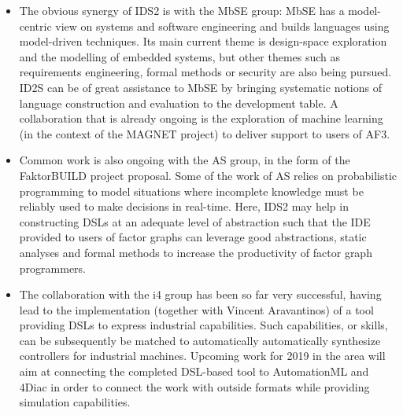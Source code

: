\documentclass{article}
\begin{document}
\begin{itemize}
\item The obvious synergy of IDS2 is with the MbSE group: MbSE has a
model-centric view on systems and software engineering and builds languages using model-driven
techniques. Its main current theme is design-space exploration and the modelling
of  embedded systems, but other themes such as requirements engineering, formal
methods or security are also being pursued. ID2S can be of great assistance to
MbSE by bringing systematic notions of language construction and evaluation to
the development table. A collaboration that is already ongoing is the
exploration of machine learning (in the context of the MAGNET project) to deliver support to users of AF3.
\item Common work is also ongoing with the AS group, in the form of the
FaktorBUILD project proposal. Some of the work of AS relies on probabilistic
programming to model situations where incomplete knowledge must be reliably used
to make decisions in real-time. Here, IDS2 may help in constructing DSLs at an
adequate level of abstraction such that the IDE provided to users of factor
graphs can leverage good abstractions, static analyses and formal methods to
increase the productivity of factor graph programmers.
\item The collaboration with the i4 group has been so far very successful,
having lead to the implementation (together with Vincent Aravantinos) of a tool
providing DSLs to express industrial capabilities. Such capabilities, or
skills, can be subsequently be matched to automatically automatically synthesize
controllers for industrial machines. Upcoming work for 2019 in the area will aim
at connecting the completed DSL-based tool to AutomationML and 4Diac in order
to connect the work with outside formats while providing simulation capabilities. 
\end{itemize}

\pagebreak
 
\end{document}
